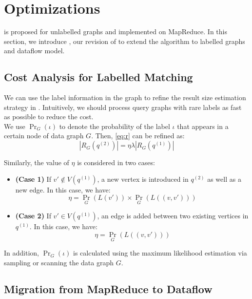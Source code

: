 \section{Optimizations}
\label{sec:opt}

\cliquejoin is proposed for unlabelled graphs and implemented on MapReduce. In this section, we introduce \gencliqjoin, our revision of \cliquejoin to extend the algorithm to labelled graphs and dataflow model.

\subsection{Cost Analysis for Labelled Matching}

We can use the label information in the graph to refine the result size estimation strategy in \gencliqjoin. Intuitively, we should process query graphs with rare labels as fast as possible to reduce the cost. \\

We use $\Pr_{G}(\iota)$ to denote the probability of the label $\iota$ that appears in a certain node of data graph $G$. Then, \eqref{eq:r} can be refined as:
\begin{equation} \label{eq:rr}
|R_{G}(q^{(2)})|=\eta\lambda |R_{G}(q^{(1)})|
\end{equation}

Similarly, the value of $\eta$ is considered in two cases:

\begin{itemize}
\item \textbf{(Case 1)} If $v'\not\in V(q^{(1)})$, a new vertex is introduced in $q^{(2)}$ as well as a new edge. In this case, we have:
\begin{equation} \label{eq6-new}
 \textstyle \eta = \Pr_{G}(L(v')) \times \Pr_{G}(L((v,v')))
\end{equation}

\item \textbf{(Case 2)} If $v'\in V(q^{(1)})$, an edge is added between two existing vertices in $q^{(1)}$. In this case, we have:
\begin{equation} \label{eq:7-new}
\textstyle \eta = \Pr_{G}(L((v,v')))
\end{equation}
\end{itemize}

In addition, $\Pr_{G} (\iota)$ is calculated using the maximum likelihood estimation via sampling or scanning the data graph $G$.

\subsection{Migration from MapReduce to Dataflow} \label{to-df}

